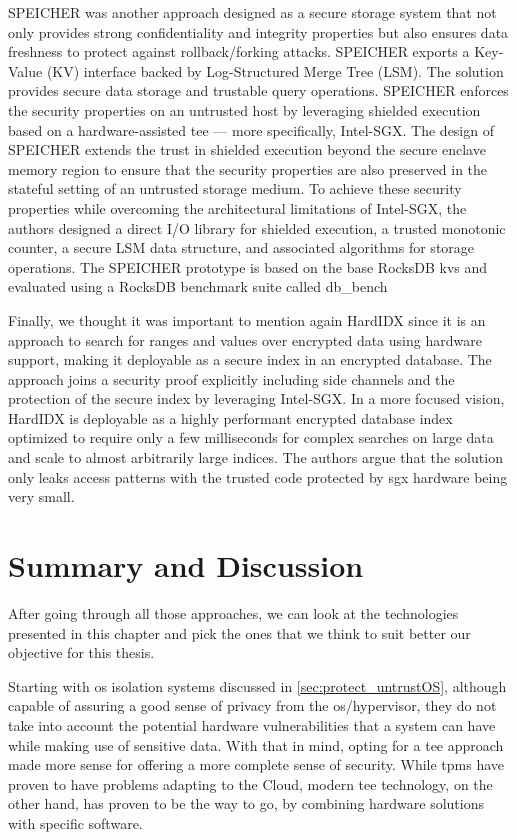 SPEICHER \cite{speicher} was another approach designed as a secure storage system that not only provides strong confidentiality and integrity properties but also ensures data freshness to protect against rollback/forking attacks. SPEICHER exports a Key-Value (KV) interface backed by Log-Structured Merge Tree (LSM). The solution provides secure data storage and trustable query operations. SPEICHER enforces the security properties on an untrusted host by leveraging shielded execution based on a hardware-assisted \gls{tee} — more specifically, Intel-SGX. The design of SPEICHER extends the trust in shielded execution beyond the secure enclave memory region to ensure that the security properties are also preserved in the stateful setting of an untrusted storage medium. To achieve these security properties while overcoming the architectural limitations of Intel-SGX, the authors designed a direct I/O library for shielded execution, a trusted monotonic counter, a secure LSM data structure, and associated algorithms for storage operations. The SPEICHER prototype is based on the base RocksDB \cite{rocksDB} \gls{kvs} and evaluated using a RocksDB benchmark suite called db\_bench \cite{dbBench}

Finally, we thought it was important to mention again HardIDX since it is an approach to search for ranges and values over encrypted data using hardware support, making it deployable as a secure index in an encrypted database. The approach joins a security proof explicitly including side channels and the protection of the secure index by leveraging Intel-SGX. In a more focused vision,  HardIDX is deployable as a highly performant encrypted database index optimized to require only a few milliseconds for complex searches on large data and scale to almost arbitrarily large indices. The authors argue that the solution only leaks access patterns with the trusted code protected by \gls{sgx} hardware being very small.



\section{Summary and Discussion}
\label{sec:summary}


After going through all those approaches, we can look at the technologies presented in this chapter and pick the ones that we think to suit better our objective for this thesis. 

Starting with \gls{os} isolation systems discussed in \ref{sec:protect_untrustOS}, although capable of assuring a good sense of privacy from the \gls{os}/hypervisor, they do not take into account the potential hardware vulnerabilities that a system can have while making use of sensitive data. 
With that in mind, opting for a \gls{tee} approach made more sense for offering a more complete sense of security.
While \gls{tpm}s have proven to have problems adapting to the Cloud, modern \gls{tee} technology, on the other hand, has proven to be the way to go, by combining hardware solutions with specific software.

